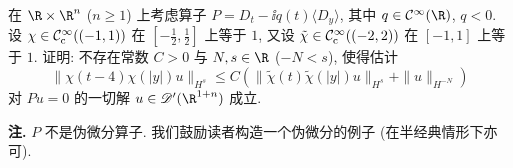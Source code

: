 \begin{exer}\label{ex:8.8}
在 $\R \times \R^n$ ($n \ge 1$) 上考虑算子 $P = D_t - \ii q(t)\langle D_y \rangle$, 其中 $q \in \Smooth(\R)$, $q < 0$. 设 $\chi \in \mathcal{C}_{\mathrm{c}}^\infty((-1, 1))$ 在 $[-\frac{1}{2}, \frac{1}{2}]$ 上等于 $1$, 又设 $\tilde{\chi} \in \mathcal{C}_{\mathrm{c}}^\infty((-2, 2))$ 在 $[-1, 1]$ 上等于 $1$. 证明: 不存在常数 $C > 0$ 与 $N, s \in \R$ ($-N < s$), 使得估计
\begin{equation}\label{eq:8.121}
    \| \chi(t - 4)\chi(| y |)u \|_{H^s} \le C\left( \| \tilde{\chi}(t)\tilde{\chi}(| y |)u \|_{H^s} + \| u \|_{H^{-N}} \right)
\end{equation}
对 $Pu = 0$ 的一切解 $u \in \Distr(\R^{1+n})$ 成立.

\smallskip
\noindent\textbf{注.} $P$ 不是伪微分算子. 我们鼓励读者构造一个伪微分的例子 (在半经典情形下亦可).
\end{exer}

